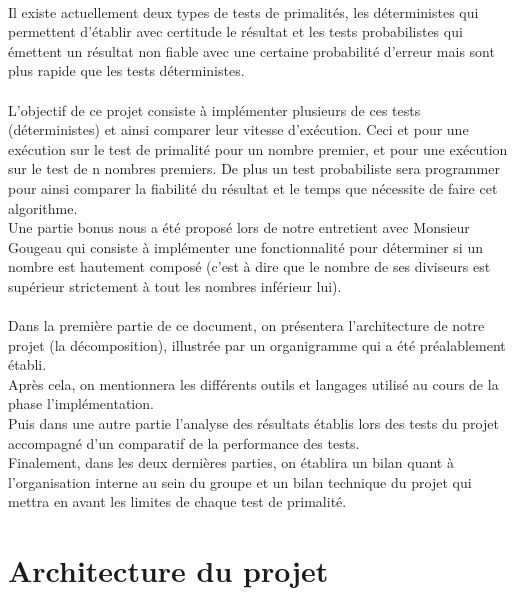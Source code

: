 	\paragraph{}Il existe actuellement deux types de tests de primalités, les déterministes qui permettent d'établir avec certitude le résultat et les tests probabilistes qui émettent un résultat non fiable avec une certaine probabilité d'erreur mais sont plus rapide que les tests déterministes.
	
	\paragraph{}L'objectif de ce projet consiste à implémenter plusieurs de ces tests (déterministes) et ainsi comparer leur vitesse  d'exécution. Ceci et pour une exécution sur le test de primalité pour un nombre premier, et pour une exécution sur le test de n nombres premiers. De plus un test probabiliste sera programmer pour ainsi comparer la fiabilité du résultat et le temps que nécessite de faire cet algorithme.\\ 
	Une partie bonus nous a été proposé lors de notre entretient avec Monsieur Gougeau qui consiste à implémenter une fonctionnalité pour déterminer si un nombre est hautement composé (c'est à dire que le nombre de ses diviseurs est supérieur strictement à tout les nombres inférieur lui). 
	
	\paragraph{}Dans la première partie de ce document, on présentera l'architecture de notre projet (la décomposition), illustrée par un organigramme qui a été préalablement établi.\\
	Après cela, on mentionnera les différents outils et langages utilisé au cours de la phase l'implémentation.\\
	Puis dans une autre partie l'analyse des résultats établis lors des tests du projet accompagné d'un comparatif de la performance des tests.\\
	Finalement, dans les deux dernières parties, on établira un bilan quant à l'organisation interne au sein du groupe et un bilan technique du projet qui mettra en avant les limites de chaque test de primalité.
	
		
	\section{Architecture du projet}
